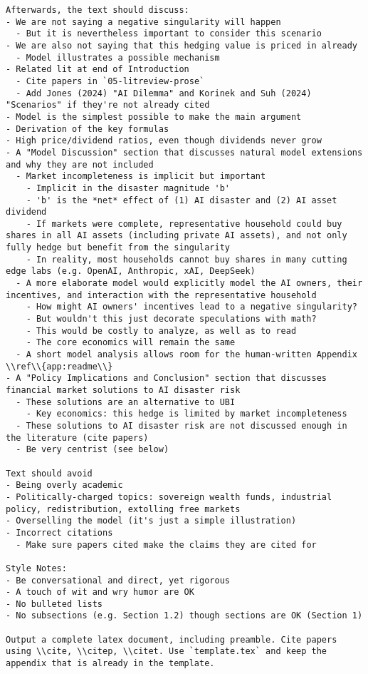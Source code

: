 \begin{lstlisting}[language=text,breaklines=true,frame=single]
Afterwards, the text should discuss:      
- We are not saying a negative singularity will happen
  - But it is nevertheless important to consider this scenario        
- We are also not saying that this hedging value is priced in already
  - Model illustrates a possible mechanism
- Related lit at end of Introduction
  - Cite papers in `05-litreview-prose`
  - Add Jones (2024) "AI Dilemma" and Korinek and Suh (2024) "Scenarios" if they're not already cited
- Model is the simplest possible to make the main argument
- Derivation of the key formulas
- High price/dividend ratios, even though dividends never grow
- A "Model Discussion" section that discusses natural model extensions and why they are not included
  - Market incompleteness is implicit but important
    - Implicit in the disaster magnitude 'b'
    - 'b' is the *net* effect of (1) AI disaster and (2) AI asset dividend
    - If markets were complete, representative household could buy shares in all AI assets (including private AI assets), and not only fully hedge but benefit from the singularity 
    - In reality, most households cannot buy shares in many cutting edge labs (e.g. OpenAI, Anthropic, xAI, DeepSeek)
  - A more elaborate model would explicitly model the AI owners, their incentives, and interaction with the representative household
    - How might AI owners' incentives lead to a negative singularity?        
    - But wouldn't this just decorate speculations with math?          
    - This would be costly to analyze, as well as to read
    - The core economics will remain the same 
  - A short model analysis allows room for the human-written Appendix \\ref\\{app:readme\\}
- A "Policy Implications and Conclusion" section that discusses financial market solutions to AI disaster risk
  - These solutions are an alternative to UBI
    - Key economics: this hedge is limited by market incompleteness
  - These solutions to AI disaster risk are not discussed enough in the literature (cite papers)
  - Be very centrist (see below)

Text should avoid      
- Being overly academic
- Politically-charged topics: sovereign wealth funds, industrial policy, redistribution, extolling free markets
- Overselling the model (it's just a simple illustration)
- Incorrect citations
  - Make sure papers cited make the claims they are cited for

Style Notes:
- Be conversational and direct, yet rigorous
- A touch of wit and wry humor are OK
- No bulleted lists
- No subsections (e.g. Section 1.2) though sections are OK (Section 1)      

Output a complete latex document, including preamble. Cite papers using \\cite, \\citep, \\citet. Use `template.tex` and keep the appendix that is already in the template.

\end{lstlisting}
\vspace{-3ex}